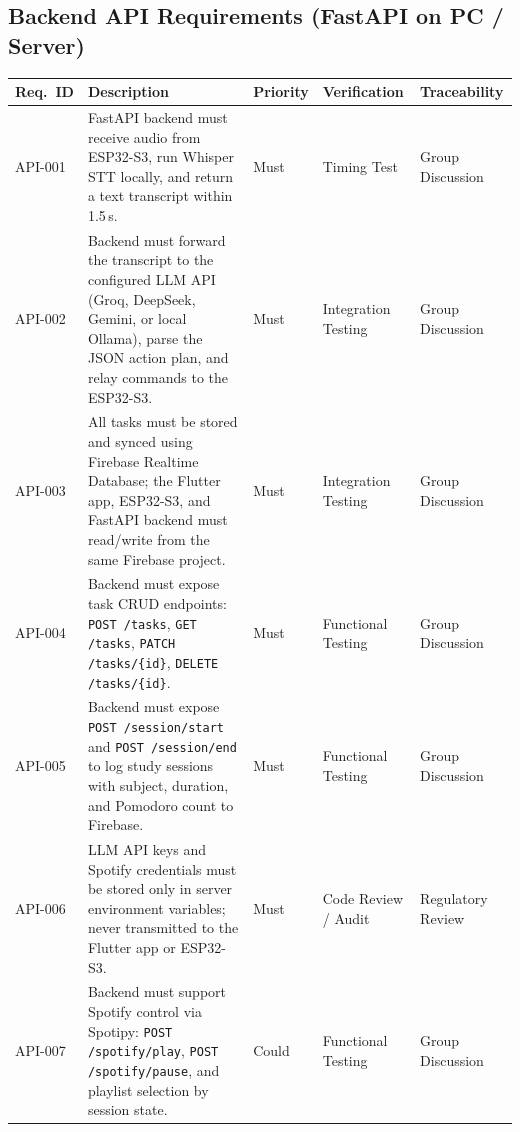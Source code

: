 \documentclass[12pt,a4paper]{article}
\begin{document}
\subsection*{Backend API Requirements (FastAPI on PC / Server)}

\begin{center}
\scriptsize
\begin{tabular}{|L{0.07\textwidth}|L{0.35\textwidth}|L{0.10\textwidth}|L{0.18\textwidth}|L{0.18\textwidth}|}
\hline
\textbf{Req.~ID} & \textbf{Description} & \textbf{Priority} &
\textbf{Verification} & \textbf{Traceability} \\ \hline
API-001 &
FastAPI backend must receive audio from ESP32-S3, run Whisper
STT locally, and return a text transcript within 1.5\,s. &
Must &
Timing Test &
Group Discussion \\ \hline
API-002 &
Backend must forward the transcript to the configured LLM API
(Groq, DeepSeek, Gemini, or local Ollama), parse the JSON
action plan, and relay commands to the ESP32-S3. &
Must &
Integration Testing &
Group Discussion \\ \hline
API-003 &
All tasks must be stored and synced using Firebase Realtime
Database; the Flutter app, ESP32-S3, and FastAPI backend must
read/write from the same Firebase project. &
Must &
Integration Testing &
Group Discussion \\ \hline
API-004 &
Backend must expose task CRUD endpoints:
\texttt{POST /tasks}, \texttt{GET /tasks},
\texttt{PATCH /tasks/\{id\}}, \texttt{DELETE /tasks/\{id\}}. &
Must &
Functional Testing &
Group Discussion \\ \hline
API-005 &
Backend must expose \texttt{POST /session/start} and
\texttt{POST /session/end} to log study sessions with subject,
duration, and Pomodoro count to Firebase. &
Must &
Functional Testing &
Group Discussion \\ \hline
API-006 &
LLM API keys and Spotify credentials must be stored only in
server environment variables; never transmitted to the Flutter
app or ESP32-S3. &
Must &
Code Review / Audit &
Regulatory Review \\ \hline
API-007 &
Backend must support Spotify control via Spotipy:
\texttt{POST /spotify/play}, \texttt{POST /spotify/pause},
and playlist selection by session state. &
Could &
Functional Testing &
Group Discussion \\ \hline
\end{tabular}
\end{center}

\vspace{0.5cm}
\end{document}
